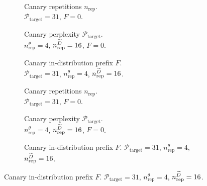 \begin{figure*}[ht]
  \centering
  \begin{subfigure}{0.32\textwidth}
    \centering
    \resizebox{\textwidth}{!}{}
    \caption{
        Canary repetitions $n_\textrm{rep}$. \\ $\mathcal{P}_\textrm{target} = 31$, $F=0$.
    }
    \label{subfig:repetitions_sst2}
  \end{subfigure}
  \begin{subfigure}{0.32\textwidth}
    \centering
    \resizebox{\textwidth}{!}{}
    \caption{
        Canary perplexity $\mathcal{P}_\textrm{target}$. \\
        $n_\textrm{rep}^\theta=4$, $n_\textrm{rep}^{{\widetilde{D}}}=16$, $F=0$.
    }
    \label{subfig:perplexity_sst2}
  \end{subfigure}
  \begin{subfigure}{0.32\textwidth}
    \centering
    \resizebox{\textwidth}{!}{}
    \caption{
        Canary in-distribution prefix $F$. \\
        $\mathcal{P}_\textrm{target}=31$, $n_\textrm{rep}^{\theta}=4$, $n_\textrm{rep}^{{\widetilde{D}}}=16$.
    }
    \label{subfig:prefix_sst2}
  \end{subfigure}
  \begin{subfigure}{0.32\textwidth}
    \centering
    \resizebox{\textwidth}{!}{}
    \caption{
        Canary repetitions $n_\textrm{rep}$.  \\ $\mathcal{P}_\textrm{target} = 31$, $F=0$.
    }
    \label{subfig:repetitions_agnews}
  \end{subfigure}
  \begin{subfigure}{0.32\textwidth}
    \centering
    \resizebox{\textwidth}{!}{}
    \caption{
        Canary perplexity $\mathcal{P}_\textrm{target}$.\\
        $n_\textrm{rep}^\theta=4$, $n_\textrm{rep}^{{\widetilde{D}}}=16$, $F=0$.
    }
    \label{subfig:perplexity_agnews}
  \end{subfigure}
  \begin{subfigure}{0.32\textwidth}
    \centering
    \resizebox{\textwidth}{!}{}
    \caption{
        Canary in-distribution prefix $F$. $\mathcal{P}_\textrm{target}=31$, $n_\textrm{rep}^\theta=4$, $n_\textrm{rep}^{{\widetilde{D}}}=16$.
    }

\end{subfigure}
\end{figure*}
